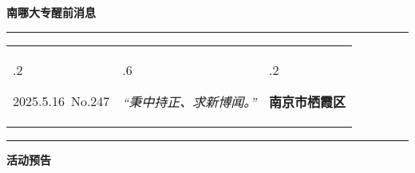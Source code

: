 \documentclass[letterpaper, 12pt]{article}
\begin{document}
\begin{center}
    \Huge\textbf{南哪大专醒前消息}
\end{center}
\vspace{4mm}
\hrule
\renewcommand\tabularxcolumn[1]{m{#1}}
\begin{tabularx}{\textwidth}{>{\hsize.2\hsize}X>{\hsize.6\hsize}X>{\hsize.2\hsize}X}
    \begin{flushleft}
        2025.5.16\, No.247
    \end{flushleft}
    &
    \begin{center}
        \textit{“秉中持正、求新博闻。”}
    \end{center}
    &
    \begin{flushright}
        \textbf{南京市栖霞区}
    \end{flushright}
\end{tabularx}
\vspace{-3.5mm}
\hrule
\vspace{4mm}
\centerline{\huge\textbf{活动预告}}
\end{document}
